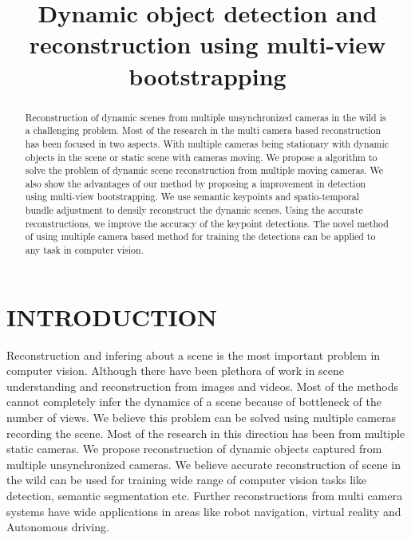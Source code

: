 \documentclass[10pt,twocolumn,letterpaper]{article}
\begin{document}
\title{Dynamic object detection and reconstruction using multi-view bootstrapping}


\maketitle

\begin{abstract}
Reconstruction of dynamic scenes from multiple unsynchronized cameras in the wild is a challenging problem. Most of the research in the multi camera based reconstruction has been focused in two aspects. With multiple cameras being stationary with dynamic objects in the scene or static scene with cameras moving. We propose a algorithm to solve the problem of dynamic scene reconstruction from multiple moving cameras. We also show the advantages of our method by proposing a improvement in detection using multi-view bootstrapping. We use semantic keypoints and spatio-temporal bundle adjustment to densily reconstruct the dynamic scenes. Using the accurate reconstructions, we improve the accuracy of the keypoint detections. The novel method of using multiple camera based method for training the detections can be applied to any task in computer vision.      
\end{abstract}
\section{INTRODUCTION}
Reconstruction and infering about a scene is the most important problem in computer vision. Although there have been plethora of work in scene understanding and reconstruction from images and videos. Most of the methods cannot completely infer the dynamics of a scene because of bottleneck of the number of views. We believe this problem can be solved using multiple cameras recording the scene. Most of the research in this direction has been from multiple static cameras. We propose reconstruction of dynamic objects captured from multiple unsynchronized cameras. We believe accurate reconstruction of scene in the wild can be used for training wide range of computer vision tasks like detection, semantic segmentation etc. Further reconstructions from multi camera systems have wide applications in areas like robot navigation, virtual reality and Autonomous driving. 
\end{document}
